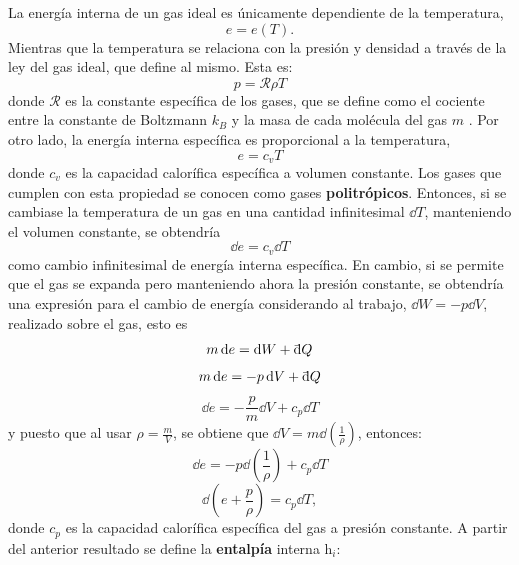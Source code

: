 La energía interna de un gas ideal es únicamente dependiente de la temperatura,
\begin{equation}
	e = e(T).
\end{equation}
Mientras que la temperatura se relaciona con la presión y densidad a través de la ley del gas ideal, que define al mismo. Esta es:
\begin{equation}
	p = \mathcal{R}\rho T
	\label{eq:ideal-gas-law}
\end{equation}
donde $\mathcal{R}$ es la constante específica de los gases, que se define como el cociente entre la constante de Boltzmann $k_B$ y  la masa de cada molécula del gas $m$ \cite{blundell}. Por otro lado, la energía interna específica es proporcional a la temperatura,
\begin{equation}
	e = c_{v}T
	\label{eq:energia-interna-1}
\end{equation}
donde $c_{v}$ es la capacidad calorífica específica a volumen constante. Los gases que cumplen con esta propiedad se conocen como gases \textbf{politrópicos}. Entonces, si se cambiase la temperatura de un gas en una cantidad infinitesimal $\dd{T}$, manteniendo el volumen constante, se obtendría
\begin{equation}
	\dd{e} = c_{v} \dd{T}
\end{equation}
como cambio infinitesimal de energía interna específica. En cambio, si se permite que el gas se expanda pero manteniendo ahora la presión constante, se obtendría una expresión para el cambio de energía considerando al trabajo, $\dd{W} = -p\dd{V}$, realizado sobre el gas, esto es
\begin{equation}
	m\dd{e} = \dd{W} + \dbar Q
\end{equation}
\begin{equation}
	m\dd{e} = -p\dd{V} + \dbar Q
\end{equation}
\begin{equation}
	\dd{e} = -\frac{p}{m}\dd{V} + c_{p}\dd{T}
\end{equation}
y puesto que al usar $\rho = \frac{m}{V}$, se obtiene que $\dd{V} = m\dd(\frac{1}{\rho})$, entonces:
\begin{equation}
	\dd{e} = -p\dd(\frac{1}{\rho}) + c_{p}\dd{T}
\end{equation}
\begin{equation}
	\dd(e + \frac{p}{\rho}) = c_{p}\dd{T},
	\label{eq:entalpia-temp-dif}
\end{equation}
donde $c_p$ es la capacidad calorífica específica del gas a presión constante. A partir del anterior resultado se define la \textbf{entalpía} interna $\mathrm{h}_i$:
